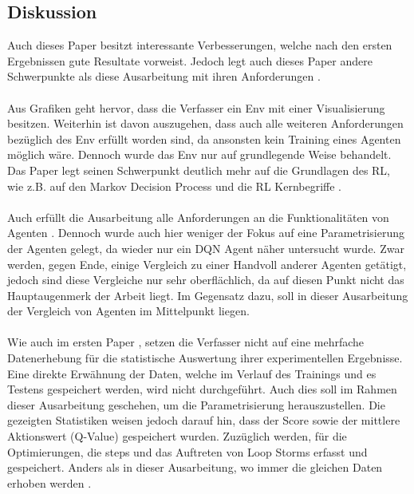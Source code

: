 \subsection{Diskussion}\label{subsec:Verwandte_Arbeiten_Paper_2_Diskussion}
Auch dieses Paper besitzt interessante Verbesserungen, welche nach den ersten Ergebnissen gute Resultate vorweist. Jedoch legt auch dieses Paper andere Schwerpunkte als diese Ausarbeitung mit ihren Anforderungen .\\
\\Aus Grafiken geht hervor, dass die Verfasser ein Env mit einer Visualisierung besitzen. Weiterhin ist davon auszugehen, dass auch alle weiteren Anforderungen bezüglich des Env  erfüllt worden sind, da ansonsten kein Training eines Agenten möglich wäre. Dennoch wurde das Env nur auf grundlegende Weise behandelt.\\
Das Paper legt seinen Schwerpunkt deutlich mehr auf die Grundlagen des RL, wie z.B. auf den Markov Decision Process und die RL Kernbegriffe .\\
\\Auch erfüllt die Ausarbeitung alle Anforderungen an die Funktionalitäten von Agenten . Dennoch wurde auch hier weniger der Fokus auf eine Parametrisierung der Agenten gelegt, da wieder nur ein DQN Agent näher untersucht wurde. Zwar werden, gegen Ende, einige Vergleich zu einer Handvoll anderer Agenten getätigt, jedoch sind diese Vergleiche nur sehr oberflächlich, da auf diesen Punkt nicht das Hauptaugenmerk der Arbeit liegt. 
Im Gegensatz dazu, soll in dieser Ausarbeitung der Vergleich von Agenten im Mittelpunkt liegen.\\
\\Wie auch im ersten Paper , setzen die Verfasser nicht auf eine mehrfache Datenerhebung für die statistische Auswertung ihrer experimentellen Ergebnisse.
Eine direkte Erwähnung der Daten, welche im Verlauf des Trainings und es Testens gespeichert werden, wird nicht durchgeführt. Auch dies soll im Rahmen dieser Ausarbeitung geschehen, um die Parametrisierung  herauszustellen.  
Die gezeigten Statistiken weisen jedoch darauf hin, dass der Score sowie der mittlere Aktionswert (Q-Value) gespeichert wurden. Zuzüglich werden, für die Optimierungen, die steps und das Auftreten von Loop Storms erfasst und gespeichert. Anders als in dieser Ausarbeitung, wo immer die gleichen Daten erhoben werden .\\
